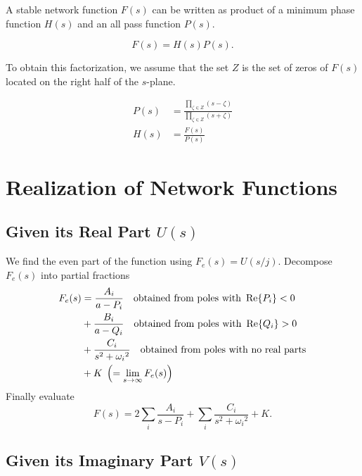 \documentclass{report}
\begin{document}
A stable network function $F(s)$ can be written as product of a minimum phase function $H(s)$ and an all pass function $P(s)$.

\[
	F(s) = H(s)P(s)
	.\]

To obtain this factorization, we assume that the set $Z$ is the set of zeros of $F(s)$ located on the right half of the $s$-plane.

\begin{align*}
	P(s) & = \frac{\prod_{\zeta \in Z} (s-\zeta)}{\prod_{\zeta \in Z} (s+\zeta)} \\
	H(s) & = \frac{F(s)}{P(s)}
\end{align*}

\section{Realization of Network Functions}

\subsection{Given its Real Part $U(s)$}

\begin{enumerate}
	\ii We find the even part of the function using $F_e(s) = U(s/j)$.
	\ii Decompose $F_e(s)$ into partial fractions
	\begin{align*}
		F_e(s) & = \frac{A_i}{a-P_i}\quad \text{obtained from poles with } \Re\{P_i\} < 0            \\
		       & + \frac{B_i}{a-Q_i}\quad \text{obtained from poles with } \Re\{Q_i\} > 0            \\
		       & + \frac{C_i}{s^2 + {\omega_i}^2}\quad \text{obtained from poles with no real parts} \\
		       & + K\;\left(=\lim_{s \to \infty} F_e(s)\right)
	\end{align*}
	\ii Finally evaluate
	\[
		F(s) = 2 \sum_{i} \frac{A_i}{s-P_i} + \sum_{i} \frac{C_i}{s^2 + {\omega_i}^2} + K
		.\]
\end{enumerate}

\subsection{Given its Imaginary Part $V(s)$}
\end{document}
